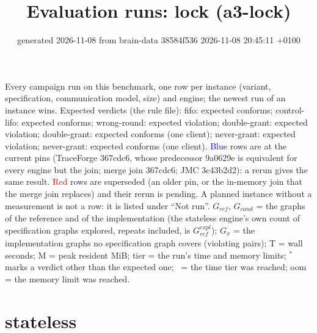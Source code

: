 \documentclass[10pt]{article}
\title{Evaluation runs: \textsf{lock} (a3-lock)}
\author{}
\date{generated 2026-11-08 from brain-data 38584f536 2026-11-08 20:45:11 +0100}
\begin{document}
\maketitle\small
\noindent Every campaign run on this benchmark, one row per instance (variant, specification, communication model, size) and engine; the newest run of an instance wins. Expected verdicts (the rule file): fifo: expected conforms; control-lifo: expected conforms; wrong-round: expected violation; double-grant: expected violation; double-grant: expected conforms (one client); never-grant: expected violation; never-grant: expected conforms (one client). \textcolor{blue}{Blue} rows are at the current pins (TraceForge 367cdc6, whose predecessor 9a0629e is equivalent for every engine but the join; merge join 367cdc6; JMC 3c43b2d2): a rerun gives the same result. \textcolor{red}{Red} rows are superseded (an older pin, or the in-memory join that the merge join replaces) and their rerun is pending. A planned instance without a measurement is not a row: it is listed under ``Not run''. $G_{\mathit{ref}}$, $G_{\mathit{cand}}$ = the graphs of the reference and of the implementation (the stateless engine's own count of specification graphs explored, repeats included, is $G_{\mathit{ref}}^{\mathit{expl}}$); $G_x$ = the implementation graphs no specification graph covers (violating pairs); T = wall seconds; M = peak resident MiB; tier = the run's time and memory limits; $^{\ast}$ marks a verdict other than the expected one; \faClock\ = the time tier was reached; oom = the memory limit was reached.

\section*{stateless}
\end{document}
